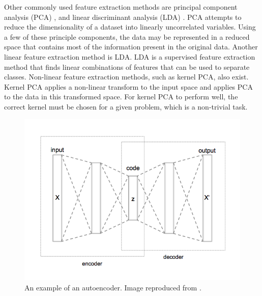 
Other commonly used feature extraction methods are principal component analysis (PCA) \cite{Jolliffe2002}, and linear discriminant analysis (LDA) \cite{Welling2007}. PCA attempts to reduce the dimensionality of a dataset into linearly uncorrelated variables. Using a few of these principle components, the data may be represented in a reduced space that contains most of the information present in the original data. Another linear feature extraction method is LDA. LDA is a supervised feature extraction method that finds linear combinations of features that can be used to separate classes. Non-linear feature extraction methods, such as kernel PCA, also exist. Kernel PCA applies a non-linear transform to the input space and applies PCA to the data in this transformed space. For kernel PCA to perform well, the correct kernel must be chosen for a given problem, which is a non-trivial task.






\begin{figure}[H]
\centering
\includegraphics[width=0.8\linewidth]{images/Autoencoder_structure}
\caption{An example of an autoencoder. Image reproduced from \cite{wiki:AutoencoderStructure}.}
\label{fig:Autoencoder_structure}
\end{figure}


